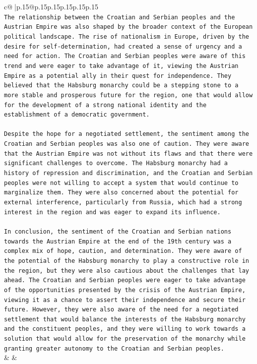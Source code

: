 \documentclass{article}
\begin{document}
{\begin{supertabular}{c@{$\;$}|p{.15\linewidth}@{}p{.15\linewidth}p{.15\linewidth}p{.15\linewidth}p{.15\linewidth}p{.15\linewidth}}
{{{\\ 
\texttt{The relationship between the Croatian and Serbian peoples and the Austrian Empire was also shaped by the broader context of the European political landscape. The rise of nationalism in Europe, driven by the desire for self{-}determination, had created a sense of urgency and a need for action. The Croatian and Serbian peoples were aware of this trend and were eager to take advantage of it, viewing the Austrian Empire as a potential ally in their quest for independence. They believed that the Habsburg monarchy could be a stepping stone to a more stable and prosperous future for the region, one that would allow for the development of a strong national identity and the establishment of a democratic government.} \\
\\ 
\texttt{Despite the hope for a negotiated settlement, the sentiment among the Croatian and Serbian peoples was also one of caution. They were aware that the Austrian Empire was not without its flaws and that there were significant challenges to overcome. The Habsburg monarchy had a history of repression and discrimination, and the Croatian and Serbian peoples were not willing to accept a system that would continue to marginalize them. They were also concerned about the potential for external interference, particularly from Russia, which had a strong interest in the region and was eager to expand its influence.} \\
\\ 
\texttt{In conclusion, the sentiment of the Croatian and Serbian nations towards the Austrian Empire at the end of the 19th century was a complex mix of hope, caution, and determination. They were aware of the potential of the Habsburg monarchy to play a constructive role in the region, but they were also cautious about the challenges that lay ahead. The Croatian and Serbian peoples were eager to take advantage of the opportunities presented by the crisis of the Austrian Empire, viewing it as a chance to assert their independence and secure their future. However, they were also aware of the need for a negotiated settlement that would balance the interests of the Habsburg monarchy and the constituent peoples, and they were willing to work towards a solution that would allow for the preservation of the monarchy while granting greater autonomy to the Croatian and Serbian peoples.} \\
            }
        }
    }
    & & \\ \\


\end{supertabular}}
\end{document}
